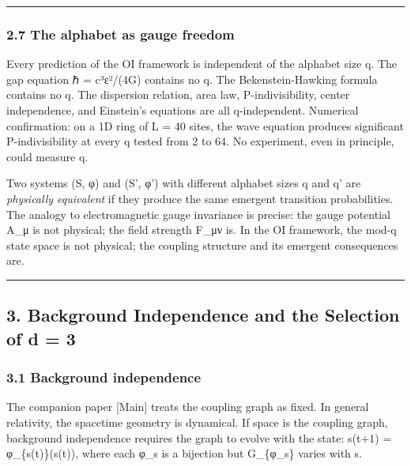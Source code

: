 \documentclass[
]{article}
\begin{document}
\begin{center}\rule{0.5\linewidth}{0.5pt}\end{center}

\hypertarget{the-alphabet-as-gauge-freedom}{%
\subsubsection{2.7 The alphabet as gauge
freedom}\label{the-alphabet-as-gauge-freedom}}

Every prediction of the OI framework is independent of the alphabet size
q. The gap equation ℏ = c³ε²/(4G) contains no q. The Bekenstein-Hawking
formula contains no q. The dispersion relation, area law,
P-indivisibility, center independence, and Einstein's equations are all
q-independent. Numerical confirmation: on a 1D ring of L = 40 sites, the
wave equation produces significant P-indivisibility at every q tested
from 2 to 64. No experiment, even in principle, could measure q.

Two systems (S, φ) and (S', φ') with different alphabet sizes q and q'
are \emph{physically equivalent} if they produce the same emergent
transition probabilities. The analogy to electromagnetic gauge
invariance is precise: the gauge potential A\_μ is not physical; the
field strength F\_μν is. In the OI framework, the mod-q state space is
not physical; the coupling structure and its emergent consequences are.

\begin{center}\rule{0.5\linewidth}{0.5pt}\end{center}

\hypertarget{background-independence-and-the-selection-of-d-3}{%
\subsection{3. Background Independence and the Selection of d =
3}\label{background-independence-and-the-selection-of-d-3}}

\hypertarget{background-independence}{%
\subsubsection{3.1 Background
independence}\label{background-independence}}

The companion paper {[}Main{]} treats the coupling graph as fixed. In
general relativity, the spacetime geometry is dynamical. If space is the
coupling graph, background independence requires the graph to evolve
with the state: s(t+1) = φ\_\{s(t)\}(s(t)), where each φ\_s is a
bijection but G\_\{φ\_s\} varies with s.
\end{document}
